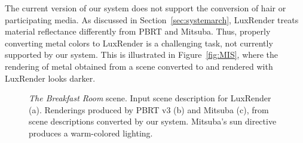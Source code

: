 The current version of our system does not support the conversion of hair or participating media. 
%
As discussed in Section~\ref{sec:systemarch}, LuxRender treats material reflectance differently from PBRT and Mitsuba. Thus, properly converting metal colors to LuxRender is a challenging task, not currently supported by our system. This is illustrated in Figure~\ref{fig:MIS}, where the rendering of metal obtained from a scene converted to and rendered with LuxRender looks darker.  

\begin{figure}
\centering
{}	
\caption{\textit{The Breakfast Room} scene. Input scene description for LuxRender (a).
	Renderings produced by PBRT v3 (b) and Mitsuba (c),
	from scene descriptions converted by our system. Mitsuba's sun directive produces a warm-colored lighting.}
\label{fig:dining-room}
\end{figure}


